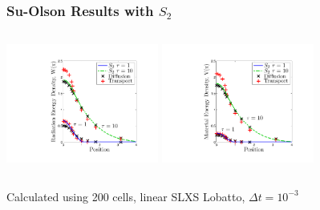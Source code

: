 \documentclass{beamer}
\begin{document}
\begin{frame}
\frametitle{Su-Olson Results with $S_2$}

\begin{columns}[t]
\centering
\includegraphics[width=5cm,trim=1.75in  0.5in 0.75in 0.5in,clip=true]{../chapter6_grey_radtran/Dissertation_Data/Su_Olson_S2_Radiation_Energy.pdf}
{}
\centering
\includegraphics[width=5cm,trim=1.75in  0.5in 0.75in 0.5in,clip=true]{../chapter6_grey_radtran/Dissertation_Data/Su_Olson_S2_Material_Energy.pdf}
\end{columns}
Calculated using 200 cells, linear SLXS Lobatto, $\Delta t = 10^{-3}$
\end{frame}
\end{document}
